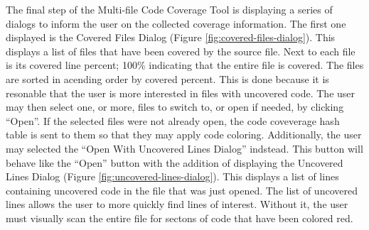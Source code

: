 The final step of the Multi-file Code Coverage Tool is displaying a series of dialogs to inform the user on the collected coverage information. The first one displayed is the Covered Files Dialog (Figure \ref{fig:covered-files-dialog}). This displays a list of files that have been covered by the source file. Next to each file is its covered line percent; 100\% indicating that the entire file is covered. The files are sorted in acending order by covered percent. This is done because it is resonable that the user is more interested in files with uncovered code. The user may then select one, or more, files to switch to, or open if needed, by clicking ``Open''. If the selected files were not already open, the code coveverage hash table is sent to them so that they may apply code coloring. Additionally, the user may selected the ``Open With Uncovered Lines Dialog'' indstead. This button will behave like the ``Open'' button with the addition of displaying the Uncovered Lines Dialog (Figure \ref{fig:uncovered-lines-dialog}). This displays a list of lines containing uncovered code in the file that was just opened. The list of uncovered lines allows the user to more quickly find lines of interest. Without it, the user must visually scan the entire file for sectons of code that have been colored red.

